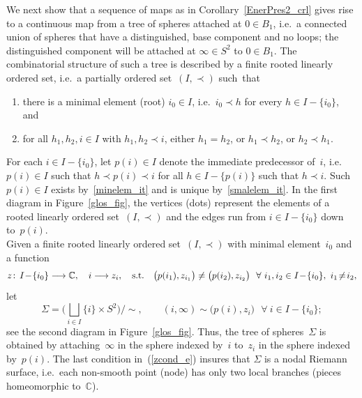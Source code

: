 \documentclass[11pt]{article}
\numberwithin{equation}{section}
\theoremstyle{definition}
\def\BE#1{\begin{equation}\label{#1}}
\def\EE{\end{equation}}
\def\eref#1{(\ref{#1})}
\def\lra{\longrightarrow}
\def\C{\mathbb{C}}
\def\Si{\Sigma}
\def\i{\infty}
\begin{document}
\noindent
We next show that a sequence of maps as in Corollary~\ref{EnerPres2_crl} gives rise 
to a continuous map from a \textsf{tree of spheres} attached at $0\!\in\!B_1$, 
i.e.~a connected union of spheres that have a distinguished, base component and
no loops;
the distinguished component will be attached at $\i\!\in\!S^2$ to $0\!\in\!B_1$.
The combinatorial structure of such a tree is described by 
a finite \textsf{rooted linearly ordered set}, i.e.~a partially ordered set~$(I,\prec)$ 
such~that 
\begin{enumerate}[label=(RS\arabic*),leftmargin=*]

\item\label{minelem_it} there is a minimal element (\textsf{root}) $i_0\!\in\!I$,
i.e.~$i_0\!\prec\!h$ for every $h\!\in\!I\!-\!\{i_0\}$, and 

\item\label{smalelem_it} 
for all $h_1,h_2,i\!\in\!I$ with $h_1,h_2\!\prec\!i$,   
either $h_1\!=\!h_2$, or $h_1\!\prec\!h_2$, or $h_2\!\prec\!h_1$.

\end{enumerate}
For each $i\!\in\!I\!-\!\{i_0\}$, let $p(i)\!\in\!I$
denote \textsf{the immediate predecessor of~$i$},
i.e.~$p(i)\!\in\!I$ such that $h\!\prec\!p(i)\!\prec\!i$ for all 
$h\!\in\!I\!-\!\{p(i)\}$ such that $h\!\prec\!i$.
Such $p(i)\!\in\!I$ exists by~\ref{minelem_it} and is unique by~\ref{smalelem_it}.
In the first diagram in Figure~\ref{glos_fig},
the vertices (dots) represent the elements of a rooted linearly ordered set~$(I,\prec)$
and the edges run from $i\!\in\!I\!-\!\{i_0\}$ down to~$p(i)$.\\

\noindent
Given a finite rooted linearly ordered set~$(I,\prec)$ with minimal element~$i_0$ and a function
\BE{zcond_e}z\!:\,I\!-\!\{i_0\}\lra\C, \quad i\lra z_i,
\quad\hbox{s.t.}\quad \big(p(i_1),z_{i_1}\big)\neq \big(p(i_2),z_{i_2}\big)
~~\forall~i_1,i_2\in I\!-\!\{i_0\},~i_1\!\neq\!i_2,\EE
let
$$\Si=\bigg(\bigsqcup_{i\in I}\{i\}\!\times\!S^2\!\bigg)\!\Big/\!\!\sim, \qquad
(i,\i)\sim\big(p(i),z_i)~~~\forall~i\!\in\!I\!-\!\{i_0\};$$
see the second diagram in Figure~\ref{glos_fig}.
Thus, the tree of spheres~$\Si$ is obtained by attaching~$\i$ in the sphere indexed by~$i$
to~$z_i$ in the sphere indexed by~$p(i)$.
The last condition in~\eref{zcond_e} insures that $\Si$ is a \textsf{nodal} Riemann surface,
i.e.~each non-smooth point (\textsf{node}) has only two local branches 
(pieces homeomorphic to~$\C$).
\end{document}
